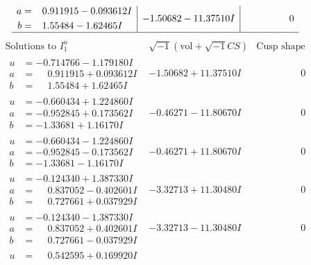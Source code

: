 \documentclass[1p]{elsarticle_modified}
\theoremstyle{definition}
\newcommand{\I}{\sqrt{-1}}
\begin{document}
$$\begin{array}{c|c|c}
\begin{aligned}
a &= \phantom{-}0.911915 - 0.093612 I \\
b &= \phantom{-}1.55484 - 1.62465 I\end{aligned}
 & -1.50682 - 11.37510 I & \phantom{-0.000000 } 0\\
 \hline 
 \end{array}$$\newpage$$\begin{array}{c|c|c}  
\text{Solutions to }I^u_{1}& \I (\text{vol} + \sqrt{-1}CS) & \text{Cusp shape}\\
 \hline 
\begin{aligned}
u &= -0.714766 - 1.179180 I \\
a &= \phantom{-}0.911915 + 0.093612 I \\
b &= \phantom{-}1.55484 + 1.62465 I\end{aligned}
 & -1.50682 + 11.37510 I & \phantom{-0.000000 } 0 \\ \hline\begin{aligned}
u &= -0.660434 + 1.224860 I \\
a &= -0.952845 + 0.173562 I \\
b &= -1.33681 + 1.16170 I\end{aligned}
 & -0.46271 - 11.80670 I & \phantom{-0.000000 } 0 \\ \hline\begin{aligned}
u &= -0.660434 - 1.224860 I \\
a &= -0.952845 - 0.173562 I \\
b &= -1.33681 - 1.16170 I\end{aligned}
 & -0.46271 + 11.80670 I & \phantom{-0.000000 } 0 \\ \hline\begin{aligned}
u &= -0.124340 + 1.387330 I \\
a &= \phantom{-}0.837052 - 0.402601 I \\
b &= \phantom{-}0.727661 + 0.037929 I\end{aligned}
 & -3.32713 + 11.30480 I & \phantom{-0.000000 } 0 \\ \hline\begin{aligned}
u &= -0.124340 - 1.387330 I \\
a &= \phantom{-}0.837052 + 0.402601 I \\
b &= \phantom{-}0.727661 - 0.037929 I\end{aligned}
 & -3.32713 - 11.30480 I & \phantom{-0.000000 } 0 \\ \hline\begin{aligned}
u &= \phantom{-}0.542595 + 0.169920 I \\

\end{aligned}
\end{array}$$
\end{document}
